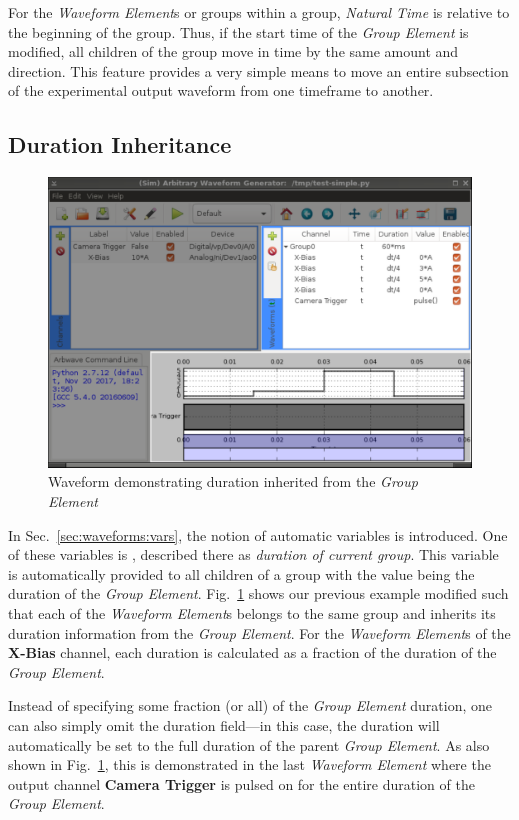 For the \textit{Waveform Element}s or groups within a group, \textit{Natural
Time} is relative to the beginning of the group.  Thus, if the start time of the
\textit{Group Element} is modified, all children of the group move in time by
the same amount and direction.  This feature provides a very simple means to
move an entire subsection of the experimental output waveform from one timeframe
to another.

\subsection{Duration Inheritance}

\begin{figure}[hbt!]
  \centerline{\includegraphics[width=.8\textwidth]{figures/basic-waveform_group}}
  \caption{
    Waveform demonstrating duration  inherited from the
    \textit{Group Element}
  }
  \label{fig:waveforms:basic_group}
\end{figure}

In Sec.~\ref{sec:waveforms:vars}, the notion of automatic variables is
introduced.  One of these variables is , described there as
\textit{duration of current group}.  This variable is automatically provided to
all children of a group with the value being the duration of the \textit{Group
Element}.  Fig.~\ref{fig:waveforms:basic_group} shows our previous example
modified such that each of the \textit{Waveform Element}s belongs to the same
group and inherits its duration information from the \textit{Group Element}.
For the \textit{Waveform Element}s of the \textbf{X-Bias} channel, each duration
is calculated as a fraction of the duration of the \textit{Group Element}.

Instead of specifying some fraction (or all) of the \textit{Group Element}
duration, one can also simply omit the duration field---in this case, the
duration will automatically be set to the full duration of the parent
\textit{Group Element}.  As also shown in Fig.~\ref{fig:waveforms:basic_group},
this is demonstrated in the last \textit{Waveform Element} where the output
channel \textbf{Camera Trigger} is pulsed on for the entire duration of the
\textit{Group Element}.



